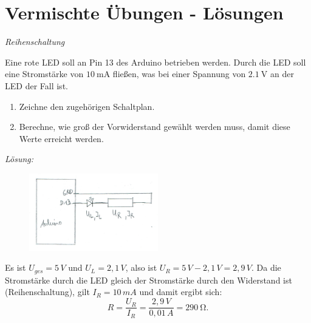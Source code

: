 \documentclass[ngerman, 11pt]{scrreprt}
\begin{document}
	\setcounter{chapter}{3}
	\setcounter{section}{8}
	\setcounter{aufgabennummer}{8}
	\onehalfspacing
	
	\section{Vermischte Übungen - Lösungen}
	
	\begin{aufgabe} \emph{Reihenschaltung}
		
		Eine rote LED soll an Pin 13 des Arduino betrieben werden. Durch die LED soll eine Stromstärke von $\SI{10}{\milli\ampere}$ fließen, was bei einer Spannung von $\SI{2,1}{\volt}$ an der LED der Fall ist. 
		\begin{enumerate}[label=\alph*), itemsep=0ex]
			\item Zeichne den zugehörigen Schaltplan.
			\item Berechne, wie groß der Vorwiderstand gewählt werden muss, damit diese Werte erreicht werden.
		\end{enumerate}
	\end{aufgabe}
	
	\bigskip
	\emph{Lösung:}
	
	\begin{figure}[H]
		\centering
		\includegraphics[width=0.5\textwidth]{../pics/uebung-reihe-schaltplan.png}
	\end{figure}
	
	Es ist $U_{ges}=5\,V$ und  $U_{L}=2,1\,V$, also ist $U_R=5\,V-2,1\,V=2,9\,V$. Da die Stromstärke durch die LED gleich der Stromstärke durch den Widerstand ist (Reihenschaltung), gilt $I_R=10\,mA$ und damit ergibt sich:
	\begin{equation*}
		R=\frac{U_R}{I_R}=\frac{2,9\,V}{0,01\,A}=\SI{290}{\ohm}.
	\end{equation*}
	
\end{document}
